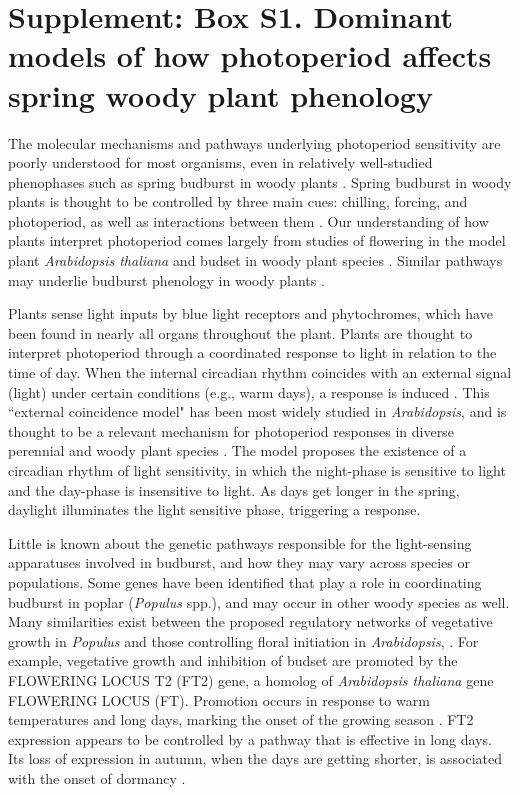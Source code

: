 \documentclass{article}
\begin{document}
\section*{Supplement: Box S1. Dominant models of how photoperiod affects spring woody plant phenology}
\par The molecular mechanisms and pathways underlying photoperiod sensitivity are poorly understood for most organisms, even in relatively well-studied phenophases such as spring budburst in woody plants \citep{ding2016}. Spring budburst in woody plants is thought to be controlled by three main cues: chilling, forcing, and photoperiod, as well as interactions between them \citep{flynn2018,Heide:2008aa, zohner2016}. Our understanding of how plants interpret photoperiod comes largely from studies of flowering in the model plant \emph{Arabidopsis thaliana} \citep[e.g.,][]{suarez2001} and budset in woody plant species \citep[e.g., ][]{Howe:1996}. Similar pathways may underlie budburst phenology in woody plants \citep{lagercrantz2009,ding2016}.
\par Plants sense light inputs by blue light receptors and phytochromes, which have been found in nearly all organs throughout the plant. Plants are thought to interpret photoperiod through a coordinated response to light in relation to the time of day. When the internal circadian rhythm coincides with an external signal (light) under certain conditions (e.g., warm days), a response is induced \citep{lagercrantz2009}. This ``external coincidence model" has been most widely studied in \emph{Arabidopsis}, and is thought to be a relevant mechanism for photoperiod responses in diverse perennial and woody plant species \citep{davis2002,petterle2013,bastow2002,kobayashi2007,andres2012,Singh:2017}. %
The model proposes the existence of a circadian rhythm of light sensitivity, in which the night-phase is sensitive to light and the day-phase is insensitive to light. As days get longer in the spring, daylight illuminates the  light sensitive phase, triggering a response. %
\par Little is known about the genetic pathways responsible for the light-sensing apparatuses involved in budburst, and how they may vary across species or populations. Some genes have been identified that play a role in coordinating budburst in poplar (\emph{Populus} spp.), and may occur in other woody species as well. Many similarities exist between the proposed regulatory networks of vegetative growth in \emph{Populus} and those controlling floral initiation in \emph{Arabidopsis}, \citet{ding2016}. For example, vegetative growth and inhibition of budset are promoted by the FLOWERING LOCUS T2 (FT2) gene, a homolog of \emph{Arabidopsis thaliana} gene FLOWERING LOCUS (FT). Promotion occurs in response to warm temperatures and long days, marking the onset of the growing season \citep{hsu2011}. FT2 expression appears to be controlled by a pathway that is effective in long days. Its loss of expression in autumn, when the days are getting shorter, is associated with the onset of dormancy \citep{glover2014}.
\end{document}
